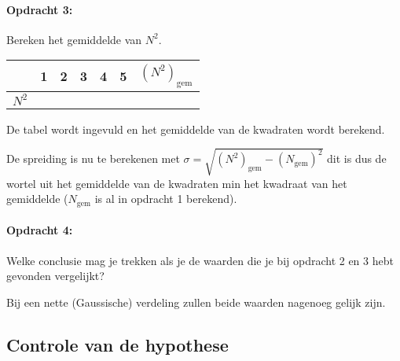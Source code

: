 \begin{minipage}[t]{1\columnwidth}%

\paragraph{Opdracht 3:}

Bereken het gemiddelde van $N^{2}$.

\bigskip{}

\begin{tabular}{|x{.11\textwidth}|x{.11\textwidth}|x{.11\textwidth}
                |x{.11\textwidth}|x{.11\textwidth}|x{.11\textwidth}
                |x{.11\textwidth}|}
     & 1 & 2 & 3 & 4 & 5 & $\left(N^{2}\right)_\textrm{gem}$\\
    \hline
    $N^{2}$ &  &  &  &  &  & \\
    \hline
\end{tabular}


\bigskip{}

De tabel wordt ingevuld en het gemiddelde van de kwadraten wordt berekend.

\bigskip{}

De spreiding is nu te berekenen met
$\sigma=\sqrt{\left(N^{2}\right)_\textrm{gem}-\left(N_\textrm{gem}\right)^{2}}$ dit is
dus de wortel uit het gemiddelde van de kwadraten min het kwadraat van
het gemiddelde ($N_\textrm{gem}$ is al in opdracht 1 berekend).

\end{minipage}

\bigskip{}

\begin{minipage}[t]{1\columnwidth}%

\paragraph{Opdracht 4:}

Welke conclusie mag je trekken als je de waarden die je bij opdracht
2 en 3 hebt gevonden vergelijkt?

\smallskip{}

Bij een nette (Gaussische) verdeling zullen beide waarden nagenoeg
gelijk zijn. %
\end{minipage}


\subsection{Controle van de hypothese}



